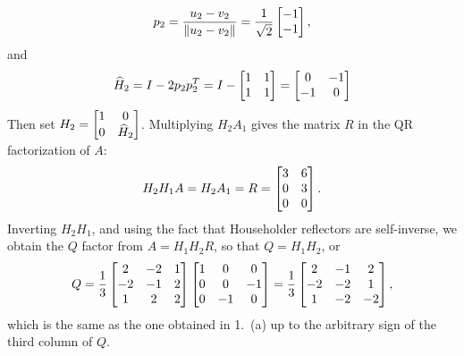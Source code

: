 \documentclass{homework}
\begin{document}
\begin{alphaparts}
\begin{equation*}
			p_2 = \frac{u_2 - v_2}{\lVert u_2 - v_2\rVert} = \frac{1}{\sqrt{2}}\left[\begin{matrix}-1\\-1\end{matrix}\right],
		\end{equation*}
		and
		\begin{equation*}
			\widehat{H}_2 = I - 2p_2p_2^T = I - \left[\begin{matrix}1 & 1 \\ 1 & 1\end{matrix}\right]=\left[\begin{matrix}0 & -1 \\ -1 & 0\end{matrix}\right]
		\end{equation*}
		Then set $H_2 = \left[\begin{matrix}1 & 0 \\ 0 & \widehat{H}_2\end{matrix}\right]$. Multiplying $H_2A_1$ gives the matrix $R$ in the QR factorization of $A$:
		\begin{equation*}
			H_2H_1A = H_2A_1 = R = \left[\begin{matrix}3 & 6 \\ 0 & 3 \\ 0& 0\end{matrix}\right].
		\end{equation*}
		Inverting $H_2H_1$, and using the fact that Householder reflectors are self-inverse, we obtain the $Q$ factor from $A = H_1H_2R$, so that $Q = H_1H_2$, or
		\begin{equation*}
			Q = \frac{1}{3}\left[\begin{matrix}2 & -2 & 1 \\ -2 & -1 & 2 \\ 1 & 2 & 2\end{matrix}\right]\left[\begin{matrix}1 & 0 & 0 \\ 0 & 0 & -1 \\ 0 & -1 & 0\end{matrix}\right] = \frac{1}{3}\left[\begin{matrix}2 & -1 & 2 \\ -2 & -2 & 1 \\ 1 & -2 & -2\end{matrix}\right],
		\end{equation*}
		which is the same as the one obtained in 1.\ (a) up to the arbitrary sign of the third column of $Q$.
		

\end{alphaparts}
\end{document}
